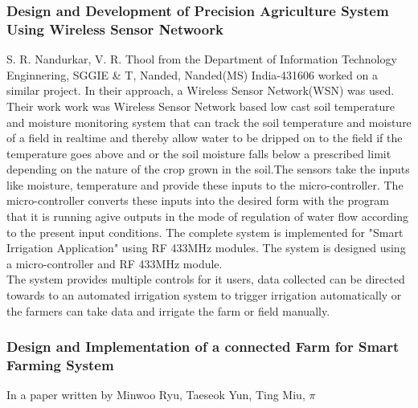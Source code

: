 \documentclass[12pt, a4paper]{article}
\begin{document}
\subsubsection{Design and Development of Precision Agriculture System Using Wireless Sensor Netwoork}
S. R. Nandurkar, V. R. Thool from the Department of Information Technology Enginnering, SGGIE \& T, Nanded, Nanded(MS) India-431606 worked on a similar project. In their approach, a Wireless Sensor Network(WSN) was used.\\
Their work work was Wireless Sensor Network based low cast soil temperature and moisture monitoring system that can track the soil temperature and moisture of a field in realtime and thereby allow water to be dripped on to the field if the temperature goes above and or the soil moisture falls below a prescribed limit depending on the nature of the crop grown in the soil.The sensors take the inputs like moisture, temperature and provide these inputs to the micro-controller. The micro-controller converts these inputs into the desired form with the program that it is running agive outputs in the mode of regulation of water flow according to the present input conditions. The complete system is implemented for "Smart Irrigation Application" using RF 433MHz modules. The system is designed using a micro-controller and RF 433MHz module.\\ The system provides multiple controls for it users, data collected can be directed towards to an automated irrigation system to trigger irrigation automatically or the farmers can take data and irrigate the farm or field manually.  
\subsubsection{Design and Implementation of a connected Farm for Smart Farming System}
In a paper written by Minwoo Ryu, Taeseok Yun, Ting Miu, $\pi$
\end{document}
